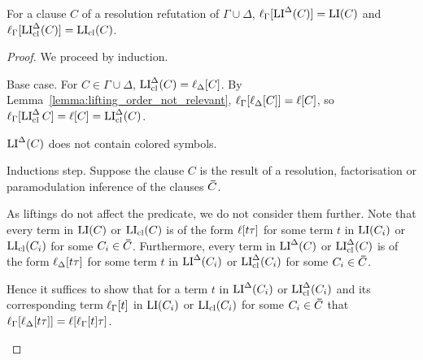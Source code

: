 \documentclass[,%
	draft=false,%
	numbers=noendperiod
	11pt,
	a4paper,
	oneside,%
	openany,
]{memoir}
\begin{document}
\begin{lemma}
	\label{lemma:gamma_lifted_lide}
	For a clause $C$ of a resolution refutation of $\Gamma\cup\Delta$, 
	$\ell_{\Gamma}[\operatorname{LI}^\Delta(C)] = \operatorname{LI}(C)$ and $\ell_{\Gamma}[\operatorname{LI}_{\operatorname{cl}}^\Delta(C)] = \operatorname{LI}_{\operatorname{cl}}(C)$.
\end{lemma}
\begin{proof}
	We proceed by induction.
	\begin{description}
		\item{} Base case.
			For $C \in \Gamma\cup\Delta$, $\operatorname{LI}_{\operatorname{cl}}^\Delta(C) = \ell_{\Delta}[C]$.
			By Lemma~\ref{lemma:lifting_order_not_relevant}, $\ell_{\Gamma}[\ell_{\Delta}[C]] = \ell[C]$,
			so $\ell_{\Gamma}[\operatorname{LI}_{\operatorname{cl}}^\Delta{C}] = \ell[C] = \operatorname{LI}_{\operatorname{cl}}^\Delta(C)$.

			$\operatorname{LI}^\Delta(C)$ does not contain colored symbols.

		\item{} Inductions step.
			Suppose the clause $C$ is the result of a resolution, factorisation or paramodulation inference \inference{} of the clauses $\bm\bar C$.


			As liftings do not affect the predicate, we do not consider them further.
			Note that every term in $\operatorname{LI}(C)$ or $\operatorname{LI}_{\operatorname{cl}}(C)$ is of the form $\ell[t\tau]$ for some term $t$ in $\operatorname{LI}(C_i)$ or $\operatorname{LI}_{\operatorname{cl}}(C_i)$ for some $C_i \in \bm\bar C$.
			Furthermore,
			every term in $\operatorname{LI}^\Delta(C)$ or $\operatorname{LI}_{\operatorname{cl}}^\Delta(C)$ is of the form $\ell_{\Delta}[t\tau]$ for some term $t$ in $\operatorname{LI}^\Delta(C_i)$ or $\operatorname{LI}_{\operatorname{cl}}^\Delta(C_i)$ for some $C_i \in \bm\bar C$.



			Hence it suffices to show that for a term $t$ in $\operatorname{LI}^\Delta(C_i)$ or $\operatorname{LI}_{\operatorname{cl}}^\Delta(C_i)$ and its corresponding term $\ell_{\Gamma}[t]$ in $\operatorname{LI}(C_i)$ or $\operatorname{LI}_{\operatorname{cl}}(C_i)$ for some $C_i \in \bm\bar C$
			that $\ell_{\Gamma}[ \ell_{\Delta}[t\tau] ] = \ell[\ell_{\Gamma}[t]\tau]$.


\end{description}
\end{proof}
\end{document}
